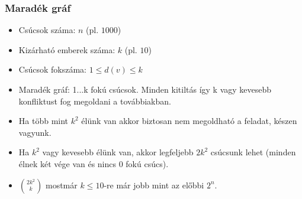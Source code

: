 \begin{frame}
\frametitle{Maradék gráf}

\begin{footnotesize}
\begin{itemize}
\item Csúcsok száma: $n$ (pl. $1000$)
\item Kizárható emberek száma: $k$ (pl. $10$)
\item Csúcsok fokszáma: $1\leq{}d(v)\leq{}k$
\end{itemize}
\end{footnotesize}

\begin{itemize}
\item Maradék gráf: 1...k fokú csúcsok. Minden kitiltás így k vagy kevesebb konfliktust fog megoldani a továbbiakban.
\item Ha több mint $k^2$ élünk van akkor biztosan nem megoldható a feladat, készen vagyunk.
\item Ha $k^2$ vagy kevesebb élünk van, akkor legfeljebb $2k^2$ csúcsunk lehet (minden élnek két vége van és nincs 0 fokú csúcs).
\item ${2k^2 \choose k}$ mostmár $k\leq{}10$-re már jobb mint az előbbi $2^n$.
\end{itemize}
\end{frame}
